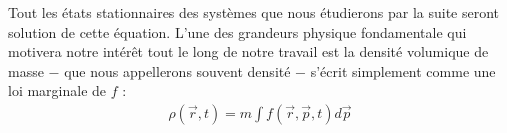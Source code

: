 	Tout les \'{e}tats stationnaires des syst\`{e}mes que nous \'{e}tudierons par la suite seront solution de cette \'{e}quation.
	L'une des grandeurs physique fondamentale qui motivera notre int\'{e}r\^{e}t tout le long de notre travail est la densit\'{e} volumique de masse $-$ que nous appellerons souvent densit\'{e} $-$ s'\'{e}crit simplement comme une loi marginale de $f$ :
	\begin{align}
		\rho(\vec{r},t) = m\int f(\vec{r},\vec{p},t) d\vec{p} \label{def-dens}
	\end{align}
